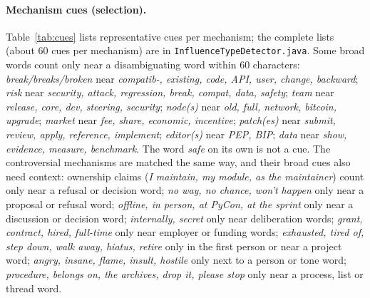 \documentclass[sigconf,screen]{acmart}
\begin{document}
\paragraph{Mechanism cues (selection).} Table~\ref{tab:cues} lists representative cues per mechanism; the complete lists (about 60 cues per mechanism) are in \texttt{InfluenceTypeDetector.java}. Some broad words count only near a disambiguating word within 60 characters: \emph{break/breaks/broken} near \emph{compatib-, existing, code, API, user, change, backward}; \emph{risk} near \emph{security, attack, regression, break, compat, data, safety}; \emph{team} near \emph{release, core, dev, steering, security}; \emph{node(s)} near \emph{old, full, network, bitcoin, upgrade}; \emph{market} near \emph{fee, share, economic, incentive}; \emph{patch(es)} near \emph{submit, review, apply, reference, implement}; \emph{editor(s)} near \emph{PEP, BIP}; \emph{data} near \emph{show, evidence, measure, benchmark}. The word \emph{safe} on its own is not a cue. The controversial mechanisms are matched the same way, and their broad cues also need context: ownership claims (\emph{I maintain, my module, as the maintainer}) count only near a refusal or decision word; \emph{no way, no chance, won't happen} only near a proposal or refusal word; \emph{offline, in person, at PyCon, at the sprint} only near a discussion or decision word; \emph{internally, secret} only near deliberation words; \emph{grant, contract, hired, full-time} only near employer or funding words; \emph{exhausted, tired of, step down, walk away, hiatus, retire} only in the first person or near a project word; \emph{angry, insane, flame, insult, hostile} only next to a person or tone word; \emph{procedure, belongs on, the archives, drop it, please stop} only near a process, list or thread word.
\end{document}
